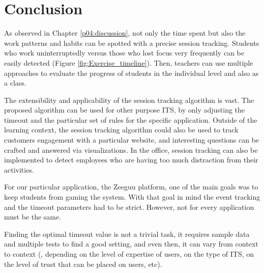 \chapter{Conclusion}\label{p05:conclusion}

As observed in Chapter \ref{p04:discussion}, not only the time spent but also the work patterns and habits can be spotted with a precise session tracking. Students who work uninterruptedly versus those who lost focus very frequently can be easily detected (Figure \ref{fig:Exercise_timeline}). Then, teachers can use multiple approaches to evaluate the progress of students in the individual level and also as a class.

The extensibility and applicability of the session tracking algorithm is vast. The proposed algorithm can be used for other purpose ITS, by only adjusting the timeout and the particular set of rules for the specific application. Outside of the learning context, the session tracking algorithm could also be used to track customers engagement with a particular website, and interesting questions can be crafted and answered via visualizations. In the office, session tracking can also be implemented to detect employees who are having too much distraction from their activities. 

For our particular application, the Zeeguu platform, one of the main goals was to keep students from gaming the system. With that goal in mind the event tracking and the timeout parameters had to be strict. However, not for every application must be the same.

Finding the optimal timeout value is not a trivial task, it requires sample data and multiple tests to find a good setting, and even then, it can vary from context to context (\eg, depending on the level of expertise of users, on the type of ITS, on the level of trust that can be placed on users, etc).

